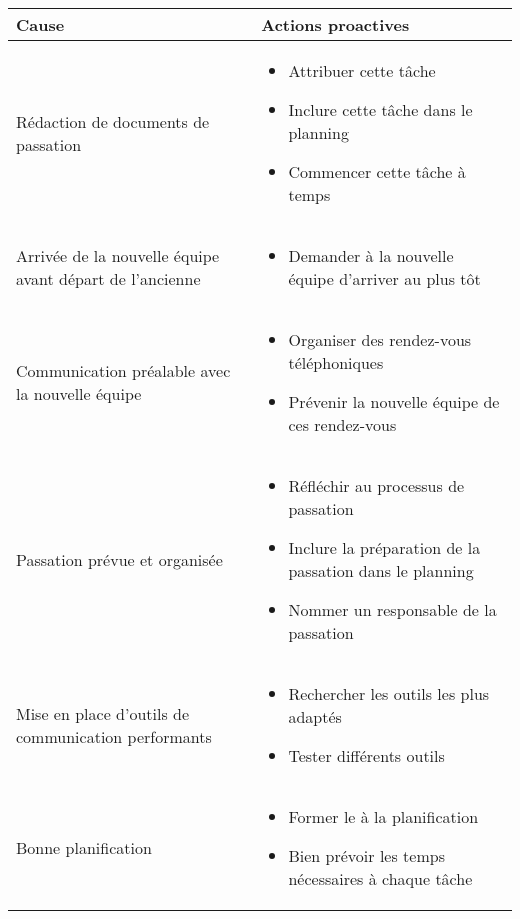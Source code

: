 {\centering
	\begin{longtable}{|p{7cm}|p{7cm}|}
	\hline
	\rowcolor{gray!40} Cause & Actions proactives \\
	\hline
	 Rédaction de documents de passation & \begin{itemize}
	 	\item Attribuer cette tâche
	 	\item Inclure cette tâche dans le planning
	 	\item Commencer cette tâche à temps
	 \end{itemize} \\
	\hline
	Arrivée de la nouvelle équipe avant départ de l'ancienne & \begin{itemize}
		\item Demander à la nouvelle équipe d'arriver au plus tôt
	\end{itemize} \\
	\hline
	Communication préalable avec la nouvelle équipe & \begin{itemize}
		\item Organiser des rendez-vous téléphoniques
		\item Prévenir la nouvelle équipe de ces rendez-vous
	\end{itemize} \\
	\hline
	Passation prévue et organisée & \begin{itemize}
		\item Réfléchir au processus de passation
		\item Inclure la préparation de la passation dans le planning
		\item Nommer un responsable de la passation
	\end{itemize} \\
	\hline
	Mise en place d'outils de communication performants & \begin{itemize}
		\item Rechercher les outils les plus adaptés
		\item Tester différents outils
	\end{itemize} \\
	\hline
	Bonne planification & \begin{itemize}
		\item Former le \CP à la planification
		\item Bien prévoir les temps nécessaires à chaque tâche
	\end{itemize} \\
	\hline

	\end{longtable}}


